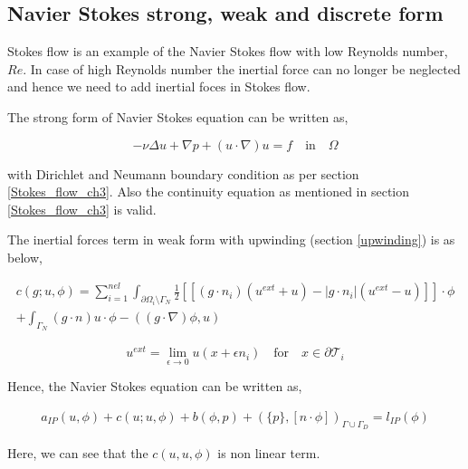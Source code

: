 \documentclass[a4paper,12pt]{book}
\begin{document}
\subsection{Navier Stokes strong, weak and discrete form} \label{n_s_ch3}

Stokes flow is an example of the Navier Stokes flow with low Reynolds number, $Re$. In case of high Reynolds number the inertial force can no longer be neglected and hence we need to add inertial foces in Stokes flow. 

The strong form of Navier Stokes equation can be written as,

\begin{equation} \label{navier_stokes_strong_ch3}
-\nu \Delta u + \nabla p + (u \cdot \nabla) u = f \quad \textrm{in} \quad \Omega
\end{equation}

with Dirichlet and Neumann boundary condition as per section \ref{Stokes_flow_ch3}. Also the continuity equation as mentioned in section \ref{Stokes_flow_ch3} is valid.

The inertial forces term in weak form with upwinding (section \ref{upwinding}) is as below,

\begin{equation}
\begin{split}
c(g;u,\phi) = \sum_{i=1}^{nel} \int_{\partial \Omega_i \setminus \Gamma_N} \frac{1}{2} [[(g \cdot n_i)(u^{ext} + u) - |g \cdot n_i|(u^{ext} - u)]] \cdot \phi \\ + \int_{\Gamma_N} (g\cdot n) u \cdot \phi -((g\cdot \nabla)\phi,u)
\end{split}
\end{equation}

\begin{equation} \label{uext}
u^{ext} = \lim_{\epsilon \rightarrow 0} u(x+\epsilon n_i) \quad  \textrm{for} \quad x \in \partial \mathcal{T}_i
\end{equation}

Hence, the Navier Stokes equation can be written as,

\begin{equation}\label{navier_stokes_weak_ch3}
\begin{split}
a_{IP}(u,\phi) + c(u;u,\phi) + b(\phi,p) + (\{p\},[n\cdot \phi])_{\Gamma \cup \Gamma_D} = l_{IP}(\phi) 
\end{split}
\end{equation}

Here, we can see that the $c(u,u,\phi)$ is non linear term.
\end{document}
